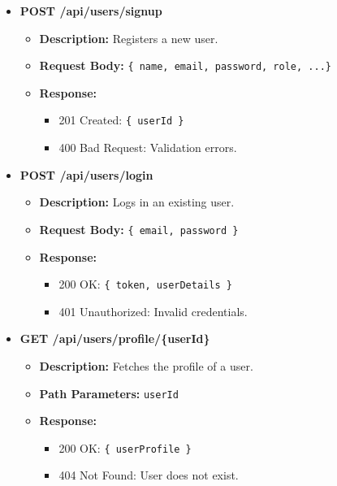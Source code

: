 \begin{itemize}
    \item \textbf{POST /api/users/signup}  
    \begin{itemize}
        \item \textbf{Description:} Registers a new user.
        \item \textbf{Request Body:} \texttt{\{ name, email, password, role, ...\}}
        \item \textbf{Response:}
        \begin{itemize}
            \item 201 Created: \texttt{\{ userId \}}
            \item 400 Bad Request: Validation errors.
        \end{itemize}
    \end{itemize}

    \item \textbf{POST /api/users/login}  
    \begin{itemize}
        \item \textbf{Description:} Logs in an existing user.
        \item \textbf{Request Body:} \texttt{\{ email, password \}}
        \item \textbf{Response:}
        \begin{itemize}
            \item 200 OK: \texttt{\{ token, userDetails \}}
            \item 401 Unauthorized: Invalid credentials.
        \end{itemize}
    \end{itemize}

    \item \textbf{GET /api/users/profile/\{userId\}}  
    \begin{itemize}
        \item \textbf{Description:} Fetches the profile of a user.
        \item \textbf{Path Parameters:} \texttt{userId}
        \item \textbf{Response:}
        \begin{itemize}
            \item 200 OK: \texttt{\{ userProfile \}}
            \item 404 Not Found: User does not exist.
        \end{itemize}
    \end{itemize}


\end{itemize}
